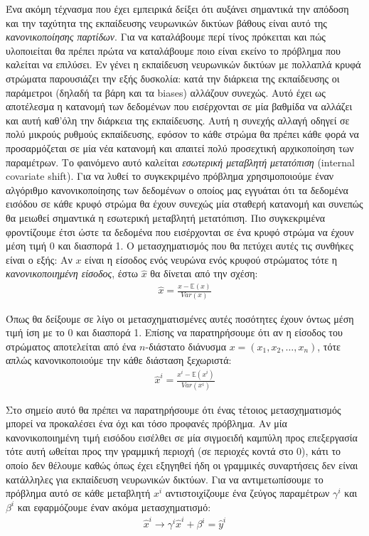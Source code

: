 \documentclass[11pt]{article} %
\numberwithin{equation}{subsection}
\begin{document}
Ένα ακόμη τέχνασμα που έχει εμπειρικά δείξει ότι αυξάνει σημαντικά την απόδοση και την ταχύτητα της εκπαίδευσης νευρωνικών δικτύων βάθους είναι αυτό της \textit{κανονικοποίησης παρτίδων}. Για να καταλάβουμε περί τίνος πρόκειται και πώς υλοποιείται θα πρέπει πρώτα να καταλάβουμε ποιο είναι εκείνο το πρόβλημα που καλείται να επιλύσει. Εν γένει η εκπαίδευση νευρωνικών δικτύων με πολλαπλά κρυφά στρώματα παρουσιάζει την εξής δυσκολία: κατά την διάρκεια της εκπαίδευσης οι παράμετροι (δηλαδή τα βάρη και τα biases) αλλάζουν συνεχώς. Αυτό έχει ως αποτέλεσμα η κατανομή των δεδομένων που εισέρχονται σε μία βαθμίδα να αλλάζει και αυτή καθ'όλη την διάρκεια της εκπαίδευσης. Αυτή η συνεχής αλλαγή οδηγεί σε πολύ μικρούς ρυθμούς εκπαίδευσης, εφόσον το κάθε στρώμα θα πρέπει κάθε φορά να προσαρμόζεται σε μία νέα κατανομή και απαιτεί πολύ προσεχτική αρχικοποίηση των παραμέτρων. Το φαινόμενο αυτό καλείται \textit{εσωτερική μεταβλητή μετατόπιση} (internal covariate shift). Για να λυθεί το συγκεκριμένο πρόβλημα χρησιμοποιούμε έναν αλγόριθμο κανονικοποίησης των δεδομένων ο οποίος μας εγγυάται ότι τα δεδομένα εισόδου σε κάθε κρυφό στρώμα θα έχουν συνεχώς μία σταθερή κατανομή και συνεπώς θα μειωθεί σημαντικά η εσωτερική μεταβλητή μετατόπιση. Πιο συγκεκριμένα φροντίζουμε έτσι ώστε τα δεδομένα που εισέρχονται σε ένα κρυφό στρώμα να έχουν μέση τιμή 0 και διασπορά 1. Ο μετασχηματισμός που θα πετύχει αυτές τις συνθήκες είναι ο εξής: Αν $x$ είναι η είσοδος ενός νευρώνα ενός κρυφού στρώματος τότε η \textit{κανονικοποιημένη είσοδος}, έστω $\hat{x}$ θα δίνεται από την σχέση:\\
\begin{align*}
\hat{x} = \frac{x - \mathbb{E}(x)}{Var(x)}
\end{align*}

Όπως θα δείξουμε σε λίγο οι μετασχηματισμένες αυτές ποσότητες έχουν όντως μέση τιμή ίση με το 0 και διασπορά 1. Επίσης να παρατηρήσουμε ότι αν η είσοδος του στρώματος αποτελείται από ένα $n$-διάστατο διάνυσμα $x = \left(x_1, x_2, \dots, x_n \right)$, τότε απλώς κανονικοποιούμε την κάθε διάσταση ξεχωριστά:
\begin{align*}
\hat{x}^i  = \frac{x^i - \mathbb{E}(x^i)}{Var(x^i)}
\end{align*}

Στο σημείο αυτό θα πρέπει να παρατηρήσουμε ότι ένας τέτοιος μετασχηματισμός μπορεί να προκαλέσει ένα όχι και τόσο προφανές πρόβλημα. Αν μία κανονικοποιημένη τιμή εισόδου εισέλθει σε μία σιγμοειδή καμπύλη προς επεξεργασία τότε αυτή ωθείται προς την γραμμική περιοχή (σε περιοχές κοντά στο 0), κάτι το οποίο δεν θέλουμε καθώς όπως έχει εξηγηθεί ήδη οι γραμμικές συναρτήσεις δεν είναι κατάλληλες για εκπαίδευση νευρωνικών δικτύων. Για να αντιμετωπίσουμε το πρόβλημα αυτό σε κάθε μεταβλητή $x^i$ αντιστοιχίζουμε ένα ζεύγος παραμέτρων $\gamma^i$ και $\beta^i$ και εφαρμόζουμε έναν ακόμα μετασχηματισμό:
\begin{align*}
\hat{x}^i \rightarrow \gamma^i \hat{x}^i + \beta^i = \hat{y}^i
\end{align*} 
\end{document}

